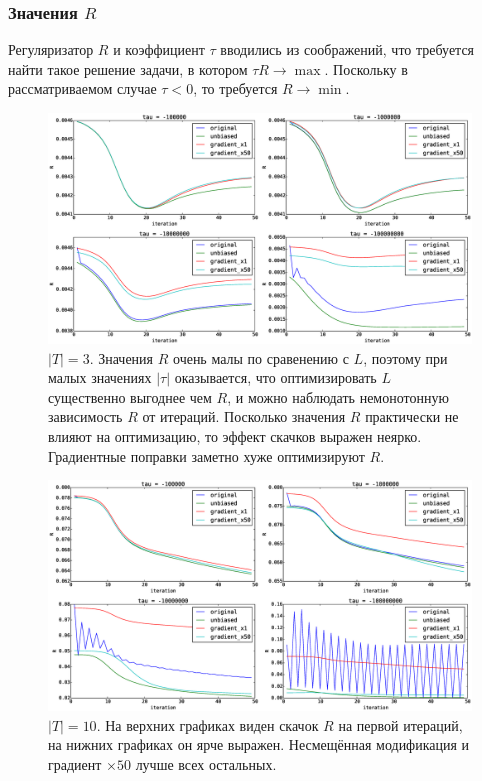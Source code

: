 \documentclass[12pt]{article}
\begin{document}
\subsubsection{Значения $R$}
Регуляризатор $R$ и коэффициент $\tau$  вводились из соображений, что требуется найти такое решение задачи, в котором $\tau R \to \max$. Поскольку в рассматриваемом случае $\tau < 0$, то требуется $R \to \min$.\\
\begin{figure}[H]
	\centering
	\caption{$|T| = 3$. Значения $R$ очень малы по сравенению с $L$, поэтому при малых значениях $|\tau|$ оказывается, что оптимизировать $L$ существенно выгоднее чем $R$, и можно наблюдать немонотонную зависимость $R$ от итераций. Посколько значения $R$ практически не влияют на оптимизацию, то эффект скачков выражен неярко. Градиентные поправки заметно хуже оптимизируют $R$.}    
	\medskip
	\includegraphics[width=1.0\linewidth]{pictures/topics_3_R_values}
\end{figure}
\begin{figure}[H]
	\centering
	\caption{$|T| = 10$. На верхних графиках виден скачок $R$ на первой итераций, на нижних графиках он ярче выражен. Несмещённая модификация и градиент $\times 50$  лучше всех остальных.}    
	\includegraphics[width=1.0\linewidth]{pictures/topics_10_R_values}
\end{figure}
\end{document}
